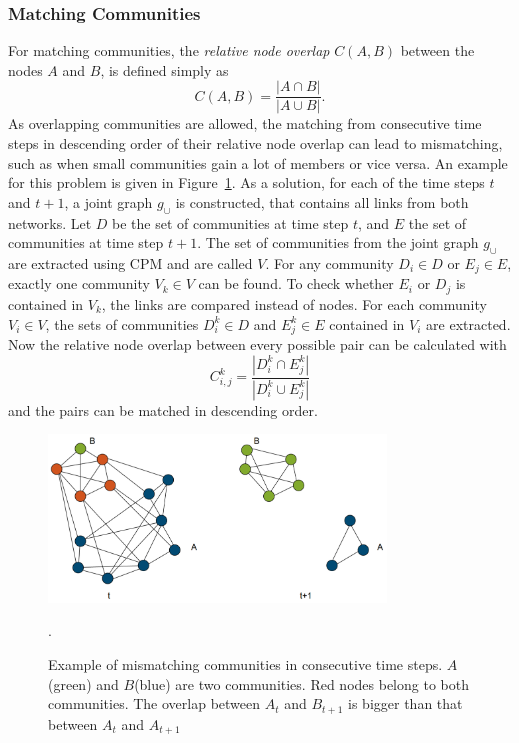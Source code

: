 \documentclass[runningheads,a4paper]{llncs}
\begin{document}
\subsubsection{Matching Communities}
\label{evolution-algo-matching}
For matching communities, the \emph{relative node overlap} $C(A,B)$ between the nodes $A$ and $B$, is defined simply as
$$C(A,B) = \frac{ \left| A \cap B\right| }{\left| A \cup B\right|}.$$
As overlapping communities are allowed, the matching from consecutive time steps in descending order of their relative node overlap can lead to mismatching, such as when small communities gain a lot of members or vice versa. An example for this problem is given in Figure~\ref{fig:mismatch}.
As a solution, for each of the time steps $t$ and $t+1$, a joint graph $g_{\cup}$ is constructed, that contains all links from both networks.
Let $D$ be the set of communities at time step $t$, and $E$ the set of communities at time step $t+1$. The set of communities from the joint graph $g_{\cup}$ are extracted using CPM and are called $V$.
For any community $D_i \in D$ or $E_j \in E$, exactly one community $V_k \in V$ can be found.
To check whether $E_i$ or $D_j$ is contained in $V_k$, the links are compared instead of nodes.
For each community $V_i \in V$, the sets of communities $D_i^k \in D$ and $E_j^k \in E$ contained in $V_i$ are extracted.
Now the relative node overlap between every possible pair can be calculated with
$$C^k_{i,j} = \frac{\left| D_i^k \cap E_j^k\right|}{\left| D_i^k\cup E_j^k \right| }$$
and the pairs can be matched in descending order.

\begin{figure}
\begin{center}
	\includegraphics[width=0.8\textwidth]{img/mismatch.png}
		\caption{Example of mismatching communities in consecutive time steps. $A$(green) and $B$(blue) are two communities. Red nodes belong to both communities. The overlap between $A_t$ and $B_{t+1}$ is bigger than that between $A_t$ and $A_{t+1}$}.
		\label{fig:mismatch}
\end{center}
\end{figure}
\end{document}
